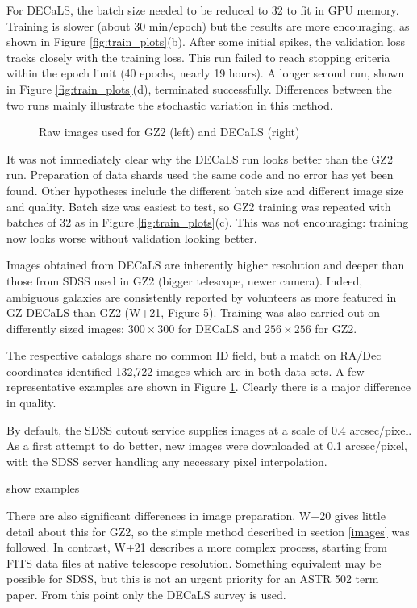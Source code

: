 \documentclass[preprint]{aastex631}
\newcommand{\todo}{\color{red}{TODO}\color{black}\hspace{2mm}}
\begin{document}
For DECaLS, the batch size needed to be reduced to 32 to fit in GPU memory. Training is slower (about 30 min/epoch) but the results are more encouraging, as shown in Figure \ref{fig:train_plots}(b). After some initial spikes, the validation loss tracks closely with the training loss. This run failed to reach stopping criteria within the epoch limit (40 epochs, nearly 19 hours). A longer second run, shown in Figure \ref{fig:train_plots}(d), terminated successfully. Differences between the two runs mainly illustrate the stochastic variation in this method.

\begin{figure}[h!]
	\caption{Raw images used for GZ2 (left) and DECaLS (right) \label{fig:images}}
\end{figure}

It was not immediately clear why the DECaLS run looks better than the GZ2 run. Preparation of data shards used the same code and no error has yet been found. Other hypotheses include the different batch size and different image size and quality. Batch size was easiest to test, so GZ2 training was repeated with batches of 32 as in Figure \ref{fig:train_plots}(c). This was not encouraging: training now looks worse without validation looking better.

Images obtained from DECaLS are inherently higher resolution and deeper than those from SDSS used in GZ2 (bigger telescope, newer camera). Indeed, ambiguous galaxies are consistently reported by volunteers as more featured in GZ DECaLS than GZ2 (W+21, Figure 5). Training was also carried out on differently sized images: $300 \times 300$ for DECaLS and $256 \times256$ for GZ2.

The respective catalogs share no common ID field, but a match on RA/Dec coordinates identified 132,722 images which are in both data sets. A few representative examples are shown in Figure \ref{fig:images}. Clearly there is a major difference in quality.

By default, the SDSS cutout service supplies images at a scale of 0.4 arcsec/pixel. As a first attempt to do better, new images were downloaded at 0.1 arcsec/pixel, with the SDSS server handling any necessary pixel interpolation.

\todo show examples

There are also significant differences in image preparation. W+20 gives little detail about this for GZ2, so the simple method described in section \ref{images} was followed.  In contrast, W+21 describes a more complex process, starting from FITS data files at native telescope resolution. Something equivalent may be possible for SDSS, but  this is not an urgent priority for an ASTR 502 term paper. From this point only the DECaLS survey is used.
\end{document}
